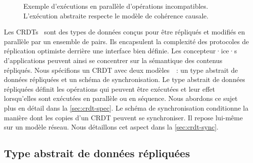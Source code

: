 \begin{figure}[htb]
\centering
{}
\caption[Exécution en parallèle d'opérations incompatibles]{Exemple d'exécutions en parallèle d'opérations incompatibles.
L'exécution abstraite respecte le modèle de cohérence causale.}\label{fig:set-conflict-example}
\end{figure}

Les \acfp{CRDT}~\autocite{shapiro_2011_crdt,roh_2011_rga} sont des types de données conçus pour être répliqués et modifiés en parallèle par un ensemble de pairs.
Ils encapsulent la complexité des protocoles de réplication optimiste derrière une interface bien définie.
Les concepteur·ice·s d'applications peuvent ainsi se concentrer sur la sémantique des contenus répliqués.
Nous spécifions un \ac{CRDT} avec deux modèles~\autocite{preguia2018_crdt}~: un type abstrait de données répliquées et un schéma de synchronisation.
Le type abstrait de données répliquées définit les opérations qui peuvent être exécutées et leur effet lorsqu'elles sont exécutées en parallèle ou en séquence.
Nous abordons ce sujet plus en détail dans la \autoref{sec:crdt-spec}.
Le schéma de synchronisation conditionne la manière dont les copies d'un \ac{CRDT} peuvent se synchroniser.
Il repose lui-même sur un modèle réseau.
Nous détaillons cet aspect dans la \autoref{sec:crdt-sync}.

\subsection{Type abstrait de données répliquées}\label{sec:crdt-spec}

